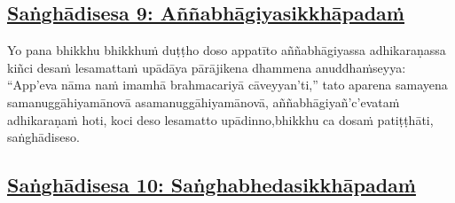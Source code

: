 \subsection*{\hyperref[comm9]{Saṅghādisesa 9: Aññabhāgiyasikkhāpadaṁ}}
\label{sd9}

Yo pana bhikkhu bhikkhuṁ duṭṭho doso appatīto aññabhāgiyassa adhikaraṇassa kiñci desaṁ lesamattaṁ upādāya pārājikena dhammena anuddhaṁseyya: ``App'eva nāma naṁ imamhā brahmacariyā cāveyyan'ti,'' tato aparena samayena samanuggāhiyamāno\makeatletter\hyperlink{endnote62-appendix}\makeatother \thinspace vā asamanuggāhiyamāno\makeatletter\hyperlink{endnote63-appendix}\makeatother \thinspace vā, aññabhāgiyañ'c'eva\makeatletter\hyperlink{endnote64-appendix}\makeatother \thinspace taṁ adhikaraṇaṁ hoti, koci deso lesamatto upādinno,\makeatletter\hyperlink{endnote65-appendix}\makeatother \thinspace bhikkhu ca dosaṁ patiṭṭhāti, saṅghādiseso.



\subsection*{\hyperref[comm10]{Saṅghādisesa 10: Saṅghabhedasikkhāpadaṁ}}
\label{sd10}

